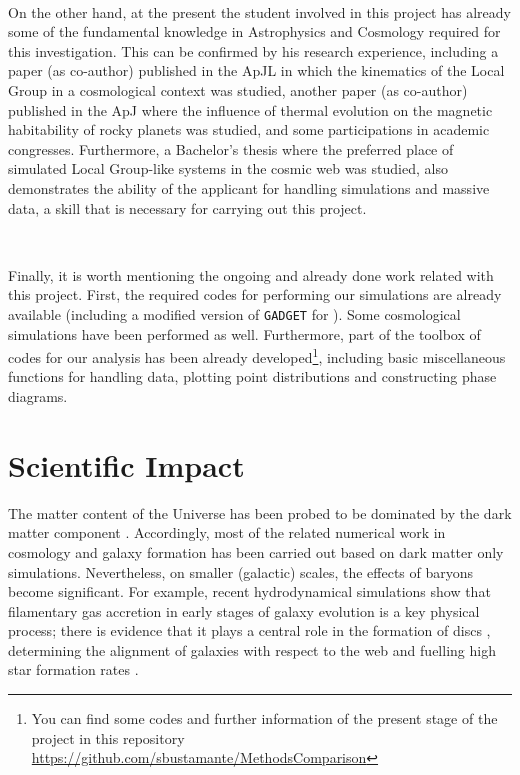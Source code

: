 \documentclass[a4,useAMS,usenatbib,usegraphicx,12pt]{article}
\begin{document}
\

On the other hand, at the present the student involved in this project has 
already some of the fundamental knowledge in Astrophysics and Cosmology required 
for this investigation. This can be confirmed by his research experience, 
including a paper (as co-author) published in the ApJL in which the kinematics 
of the Local Group in a cosmological context was studied, another paper (as 
co-author) published in the ApJ where the influence of thermal evolution on the 
magnetic habitability of rocky planets was studied, and some participations in 
academic congresses. Furthermore, a Bachelor’s thesis where the preferred place 
of simulated Local Group-like systems in the cosmic web was studied, also 
demonstrates the ability of the applicant for handling simulations and massive 
data, a skill that is necessary for carrying out this project.

\

Finally, it is worth mentioning the ongoing and already done work related with 
this project. First, the required codes for performing our simulations are already
available (including a modified version of \texttt{GADGET} for \VPH). Some
cosmological simulations have been performed as well. Furthermore, part of the 
toolbox of codes for our analysis has been already developed\footnote{You can 
find some codes and further information of the present stage of the project in 
this repository \url{https://github.com/sbustamante/MethodsComparison}}, 
including basic miscellaneous functions for handling data, plotting point 
distributions and constructing phase diagrams.


\section{Scientific Impact}
The matter content of the Universe has been probed to be dominated by the dark 
matter component \citep{Planck13XVI}. Accordingly, most of the related numerical 
work in cosmology and galaxy formation has been carried out based on dark matter 
only simulations. Nevertheless, on smaller (galactic) scales, the effects of 
baryons become significant. For example, recent hydrodynamical simulations show 
that filamentary gas accretion in early stages of galaxy evolution is a key 
physical process; there is evidence that it plays a central role in the formation 
of discs \citep{Dubois14}, determining the alignment of galaxies with respect to 
the web \citep{Hahn10} and fuelling high star formation rates \citep{Dekel09}.
\end{document}
